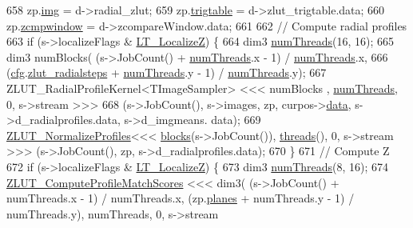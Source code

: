 \begin{DoxyCode}
{{658         zp.\hyperlink{struct_z_l_u_t_params_a14a59385e3d76c6e50dd1d97ef5f3cac}{img} = d->radial\_zlut;
659         zp.\hyperlink{struct_z_l_u_t_params_a18e5051a3a4b118b45854c69977e2dbe}{trigtable} = d->zlut\_trigtable.data;
660         zp.\hyperlink{struct_z_l_u_t_params_a5e4fca6a1f41e9dee7ba0614ab4c202d}{zcmpwindow} = d->zcompareWindow.data;
661 
662         \textcolor{comment}{// Compute radial profiles}
663         \textcolor{keywordflow}{if} (s->localizeFlags & \hyperlink{qtrk__c__api_8h_a9d32512eae44894026802d1a688c7e3ba5bee529eb0d2fa3bef01f31eeb613b92}{LT\_LocalizeZ}) \{
664             dim3 \hyperlink{class_queued_c_u_d_a_tracker_a1bbaf466f197bd745411786578b743bc}{numThreads}(16, 16);
665             dim3 numBlocks( (s->JobCount() + \hyperlink{class_queued_c_u_d_a_tracker_a1bbaf466f197bd745411786578b743bc}{numThreads}.x - 1) / 
      \hyperlink{class_queued_c_u_d_a_tracker_a1bbaf466f197bd745411786578b743bc}{numThreads}.x, 
666                     (\hyperlink{class_queued_tracker_afb847e7f49e0af6027d58af51d5914dc}{cfg}.\hyperlink{struct_q_trk_computed_config_ad1a121fa7d3152df6788ff285e4d2dc6}{zlut\_radialsteps} + \hyperlink{class_queued_c_u_d_a_tracker_a1bbaf466f197bd745411786578b743bc}{numThreads}.y - 1) / 
      \hyperlink{class_queued_c_u_d_a_tracker_a1bbaf466f197bd745411786578b743bc}{numThreads}.y);
667             ZLUT\_RadialProfileKernel<TImageSampler> <<< numBlocks , \hyperlink{class_queued_c_u_d_a_tracker_a1bbaf466f197bd745411786578b743bc}{numThreads}, 0, s->stream >>>
668                 (s->JobCount(), s->images, zp, curpos->\hyperlink{classdevice__vec_a908e53910a02968513832c242790caa0}{data}, s->d\_radialprofiles.data, s->d\_imgmeans.
      data);
669             \hyperlink{group__kernels_ga4cdd8d9a41123399c9a91d90785d9274}{ZLUT\_NormalizeProfiles}<<< \hyperlink{class_queued_c_u_d_a_tracker_a935e85ca846ef768ffeca1ff4a23ab21}{blocks}(s->JobCount()), 
      \hyperlink{class_queued_c_u_d_a_tracker_ae88c5554dba8227967f4a600ff7fab84}{threads}(), 0, s->stream >>> (s->JobCount(), zp, s->d\_radialprofiles.data);
670         \}
671         \textcolor{comment}{// Compute Z }
672         \textcolor{keywordflow}{if} (s->localizeFlags & \hyperlink{qtrk__c__api_8h_a9d32512eae44894026802d1a688c7e3ba5bee529eb0d2fa3bef01f31eeb613b92}{LT\_LocalizeZ}) \{
673             dim3 \hyperlink{class_queued_c_u_d_a_tracker_a1bbaf466f197bd745411786578b743bc}{numThreads}(8, 16);
674             \hyperlink{group__kernels_gab39221cb109c517ef2c550742f25fae3}{ZLUT\_ComputeProfileMatchScores} <<< dim3( (s->JobCount() + 
      numThreads.x - 1) / numThreads.x, (zp.\hyperlink{struct_z_l_u_t_params_ab00dffe1d70415e23bbf989d664495ab}{planes}  + numThreads.y - 1) / numThreads.y), numThreads, 0, s->stream 
}}
\end{DoxyCode}
